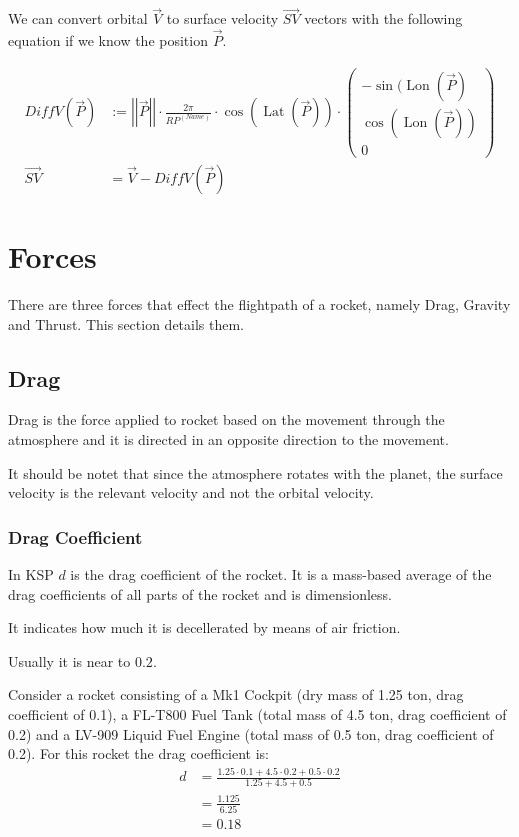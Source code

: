 \documentclass[11pt]{report}
\newcommand{\oa}[1]{\overrightarrow{#1}}
\newcommand{\Pos}{\oa{P}}
\newcommand{\Vel}{\oa{V}}
\newcommand{\absvec}[1]{\left|\left|{#1}\right|\right|}
\DeclareMathOperator{\Lat}{Lat}
\DeclareMathOperator{\Lon}{Lon}
\begin{document}
We can convert orbital $\Vel$ to surface velocity $\oa{SV}$
vectors with the following equation if we know the position $\Pos$.

\begin{align}
  DiffV(\Pos) &:= \absvec{\Pos} \cdot \frac{2 \pi}{RP^{(Name)}} \cdot \cos\left(\Lat\left(\Pos\right)\right)\cdot\left(\begin{smallmatrix}-\sin(\Lon(\Pos)\\\cos(\Lon(\Pos))\\0\end{smallmatrix}\right)\nonumber\\
  \oa{SV} &= \Vel - DiffV(\Pos)
\end{align}

\chapter{Forces}

There are three forces that effect the flightpath of a rocket, namely
Drag, Gravity and Thrust. This section details them.

\section{Drag}

 Drag is the force applied to rocket based on the movement
through the atmosphere and it is directed in an opposite direction to
the movement.

It should be notet that since the atmosphere rotates with the planet,
the surface velocity is the relevant velocity and not the orbital
velocity.

\subsection{Drag Coefficient}

In KSP $d$ is the  drag coefficient of the
rocket. It is a mass-based average of the drag coefficients of all
parts of the rocket and is dimensionless.

It indicates how much it is decellerated by means of air friction.

Usually it is near to $0.2$.

Consider a rocket consisting of a Mk1 Cockpit (dry mass of 1.25 ton,
drag coefficient of 0.1), a FL-T800 Fuel Tank (total mass of 4.5 ton,
drag coefficient of 0.2) and a LV-909 Liquid Fuel Engine (total mass
of 0.5 ton, drag coefficient of 0.2). For this rocket the drag
coefficient is:
\begin{align}
  d &= \frac{1.25 \cdot 0.1 + 4.5 \cdot 0.2 + 0.5 \cdot 0.2}{ 1.25 + 4.5 + 0.5 }\nonumber\\
  &= \frac{1.125}{6.25}\nonumber\\
  &= 0.18\nonumber
\end{align}
\end{document}
